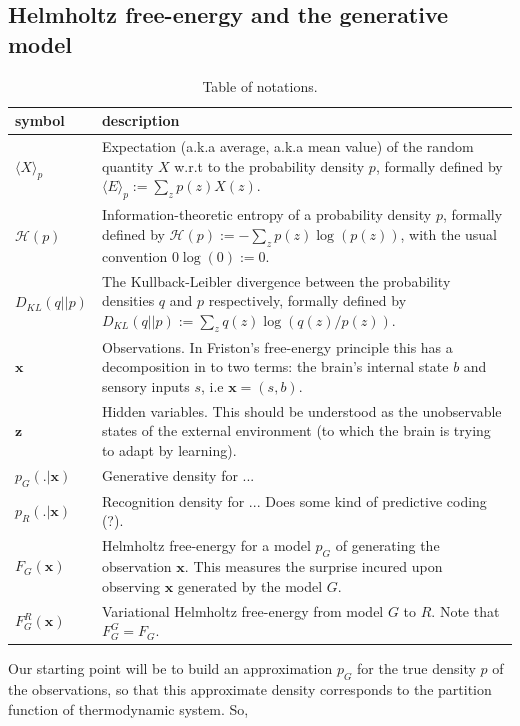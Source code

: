 \documentclass[10pt,letterpaper]{article}
\def\z{\mathbf{z}}
\def\x{\mathbf{x}}
\begin{document}
\subsection{Helmholtz free-energy and the generative model}
\begin{table}[H]
  \begin{tabular}{p{2cm}|p{11cm}}
         \hline
         \textbf{symbol}    & \textbf{description}  \\ \hline
         $\langle X\rangle_p$ & Expectation (a.k.a average, a.k.a mean value) of the
         random quantity $X$ w.r.t to the probability density $p$, formally defined by $\langle E\rangle_p := \sum_{z}p(z)X(z)$.\\ \hline
         $\mathcal H(p)$ & Information-theoretic entropy of a probability density $p$, formally defined by $\mathcal H(p) := -\sum_{z}p(z)\log(p(z))$,
          with the usual convention $0 \log(0) := 0$.\\ \hline
         $D_{KL}(q||p)$ & The Kullback-Leibler divergence between the probability densities $q$ and $p$ respectively, formally defined by $D_{KL}(q||p) := \sum_{z}q(z)\log(q(z)/p(z))$.\\ \hline
             $\x$ & Observations. In Friston's free-energy principle this has a decomposition in to two terms: the brain's internal state $b$ and sensory inputs $s$, i.e $\x = (s, b).$ \\ \hline
             $\z$ & Hidden variables. This should be understood as the unobservable states of the external environment (to which the brain is trying to adapt by learning).\\ \hline
             $p_G(.|\x)$ & Generative density for ...\\ \hline
         $p_R(.|\x)$ & Recognition density for ... Does some kind of predictive coding (?).\\ \hline
         $F_G(\x)$ & Helmholtz free-energy for a model $p_G$ of generating the observation $\x$. This measures the surprise incured upon observing $\x$ generated by the model $G$.\\ \hline
         $F^R_G(\x)$ & Variational Helmholtz free-energy from model $G$
          to $R$.  Note that $F^G_G = F_G$.\\ \hline
  \end{tabular}
  \caption{Table of notations.}
\end{table}
Our starting point will be to build an approximation $p_G$ for the true density $p$ of the observations, so that this approximate density corresponds to the partition function of thermodynamic system. So,
\end{document}
